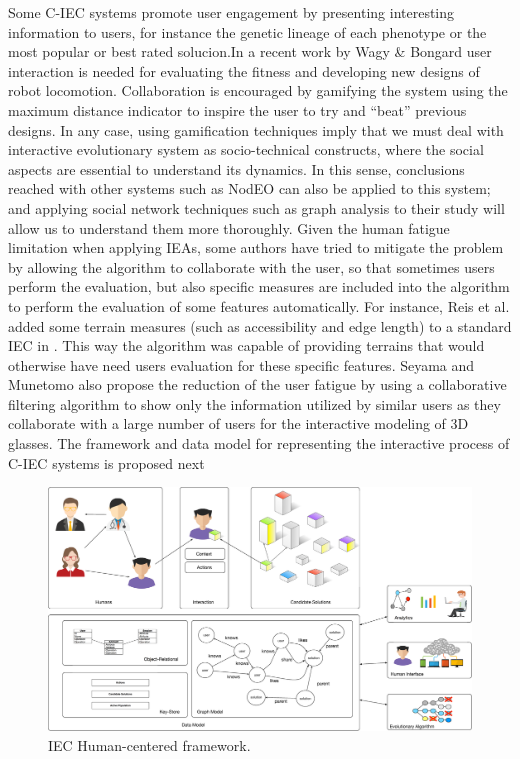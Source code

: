 Some C-IEC systems promote user engagement by presenting interesting information to 
users, for instance the genetic lineage of each phenotype or the most popular or 
best rated solucion\cite{picbreeder,forms}.In a recent work by 
Wagy \& Bongard \cite{wagy2014collective} user interaction 
is needed for evaluating the fitness and developing
new designs of robot locomotion. Collaboration is encouraged by gamifying the system 
using the maximum distance indicator to inspire the user to try and ``beat'' previous designs. 
In any case, using gamification techniques imply that we must deal with interactive evolutionary
system as socio-technical constructs, where the social aspects are
essential to understand its dynamics. In this sense, conclusions
reached with other systems such as NodEO \cite{DBLP:conf/gecco/MereloCGCRV16}
can also be applied to this system; and applying social 
network techniques such as graph analysis
to their study will allow us to understand them more thoroughly. 
Given the human fatigue limitation when applying IEAs, some authors 
have tried to mitigate the problem by allowing the algorithm to 
collaborate with the user, so that sometimes 
users perform the evaluation,  but also specific measures are included 
into the algorithm to perform the
evaluation of some features automatically. For instance, 
Reis et al. added some terrain measures (such as accessibility and edge length) 
to a standard  IEC in \cite{DBLP:journals/soco/FradeVC12}. 
This way the algorithm was capable of providing  terrains that would otherwise have need
users evaluation for these specific features. Seyama and Munetomo \cite{seyama2016development}
also propose the reduction of the user fatigue by using 
a collaborative filtering algorithm to show only the information utilized by similar users as 
they collaborate with a large number of users for the interactive modeling of 3D glasses. 
The framework and data model for 
representing the interactive process of C-IEC systems is proposed next

\begin{figure}[!t]
    \centering
        \includegraphics[width=5in]{img/framework.eps}
    \caption{IEC Human-centered framework.}
    \label{fig:hc_framework}
\end{figure}

